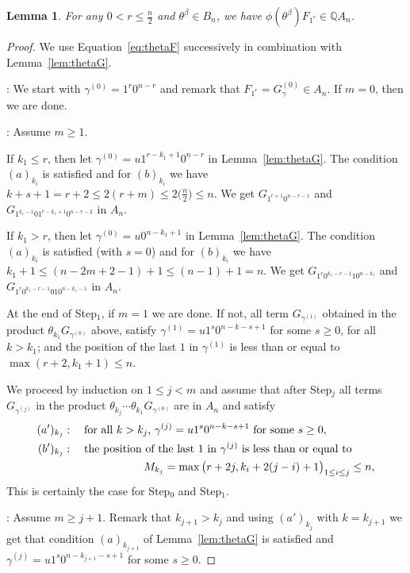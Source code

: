 \documentclass[11pt]{amsart}
\newtheorem{lemma}[theorem]{Lemma}
\theoremstyle{definition}
\numberwithin{equation}{section}
\begin{document}
\begin{lemma}\label{lem:full} 
For any $0<r\le \frac{n}{2}$  and $\theta^\beta \in B_n$, we have $\phi(\theta^\beta) F_{1^r} \in  {\mathbb Q}A_n$.
\end{lemma}

\begin{proof} We use Equation~\eqref{eq:thetaF} successively in combination with Lemma~\ref{lem:thetaG}.

\medskip
{}:
We start with $\gamma^{(0)}=1^r0^{n-r}$ and remark that $F_{1^r}=G_\gamma^{(0)}\in A_n$. If $m=0$, then we are done.

\medskip
{}: Assume $m\ge 1$.

If $k_1\le r$, then let $\gamma^{(0)}=u1^{r-k_1+1}0^{n-r}$ in Lemma~\ref{lem:thetaG}. The condition $(a)_{k_i}$ is satisfied and for $(b)_{k_i}$ we have
$k+s+1=r+2\le 2(r+m)\le 2\big(\frac{n}{2}\big)\le n$. We get $G_{1^{r+1}0^{n-r-1}}$ and $G_{1^{k_1-1}01^{r-k_1+1}0^{n-r-2}}$ in $A_n$.

If $k_1>r$, then let $\gamma^{(0)}=u0^{n-k_1+1}$ in Lemma~\ref{lem:thetaG}.  The condition $(a)_{k_i}$ is satisfied (with $s=0$) and for $(b)_{k_i}$ we have
$k_1+1\le (n-2m+2-1)+1\le (n-1)+1=n$. We get $G_{1^{r}0^{k_1-r-1}10^{n-k_1}}$ and $G_{1^{r}0^{k_1-r-1}010^{n-k_1-1}}$ in $A_n$.


At the end of Step$_1$, if $m=1$ we are done. If not, all term $G_{\gamma^{(1)}}$ obtained in the product $\theta_{k_1}G_{\gamma^{(0)}}$ above,  satisfy 
$\gamma^{(1)} = u1^{s}0^{n-k-s+1}$ for some $s\ge 0$, for all $k>k_1$;
and the position of the last $1$ in $\gamma^{(1)}$ is  less than or equal to $\max(r+2,k_1+1)\le n$.

We proceed by induction on $1\le j<m$ and assume that after Step$_{j}$ all terms $G_{\gamma^{(j)}}$  in the product $\theta_{k_{j}}\cdots\theta_{k_1}G_{\gamma^{(0)}}$
are in $A_n$ and satisfy
 \begin{align*}
 	(a')_{k_{j}}&:\quad \text{for all $k>k_{j}$,\ } \gamma^{(j)} = u1^{s}0^{n-k-s+1}\text{ for some }s\ge 0,\\
	(b')_{k_{j}}&:\quad \text{the position of the last $1$ in $\gamma^{(j)}$ is  less than or equal to}\\
	&\hskip 1in M_{k_j}=\max\big(r+2j,k_i+2(j-i)+1\big)_{1\le i\le j}\le n,
 \end{align*}
This is certainly the case for Step$_0$ and Step$_1$.

\medskip
{}: Assume $m\ge j+1$. Remark that $k_{j+1}>k_j$ and using $(a')_{k_{j}}$ with $k=k_{j+1}$ we get that condition $(a)_{k_{j+1}}$ of Lemma~\ref{lem:thetaG} is satisfied and $\gamma^{(j)} = u1^{s}0^{n-k_{j+1}-s+1}$ { for some } $s\ge 0$.


\end{proof}
\end{document}
